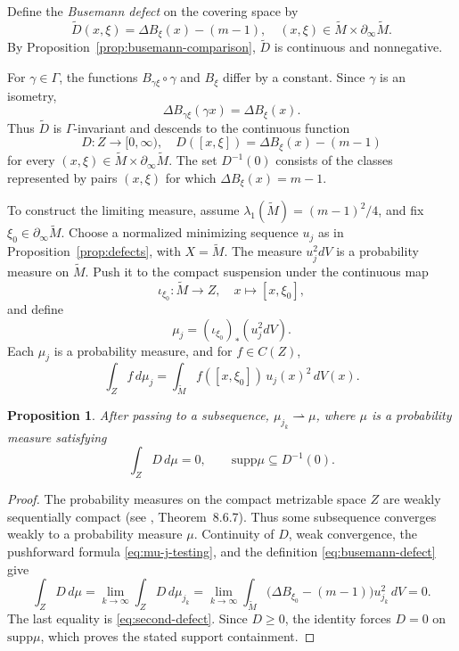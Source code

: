 \documentclass[12pt]{amsart}
\newtheorem{proposition}[theorem]{Proposition}
\theoremstyle{definition}
\numberwithin{equation}{section}
\newcommand{\wti}{\widetilde}
\newcommand{\supp}{\mathrm{supp}}
\begin{document}
Define the \emph{Busemann defect} on the covering space by
\[
  \widetilde D(x,\xi)=\Delta B_\xi(x)-(m-1),
  \quad (x,\xi)\in\wti M\times\partial_\infty\wti M.
\]
By Proposition~\ref{prop:busemann-comparison}, \(\widetilde D\) is
continuous and nonnegative.

For \(\gamma\in\Gamma\), the functions
\(B_{\gamma\xi}\circ\gamma\) and \(B_\xi\) differ by a constant.  Since
\(\gamma\) is an isometry,
\[
  \Delta B_{\gamma\xi}(\gamma x)=\Delta B_\xi(x).
\]
Thus \(\widetilde D\) is \(\Gamma\)-invariant and descends to the
continuous function
\begin{equation}\label{eq:busemann-defect}
  D\colon Z\longrightarrow[0,\infty),
  \quad
  D([x,\xi])=\Delta B_\xi(x)-(m-1)
\end{equation}
for every \((x,\xi)\in\wti M\times\partial_\infty\wti M\).  The set
\(D^{-1}(0)\) consists of the classes represented by pairs
\((x,\xi)\) for which \(\Delta B_\xi(x)=m-1\).

To construct the limiting measure, assume
\(\lambda_1(\wti M)=(m-1)^2/4\), and fix
\(\xi_0\in\partial_\infty\wti M\).  Choose a normalized minimizing sequence
\(u_j\) as in Proposition~\ref{prop:defects}, with \(X=\wti M\).  The
measure \(u_j^2dV\) is a probability measure on \(\wti M\).  Push it to
the compact suspension under the continuous map
\[
  \iota_{\xi_0}\colon\wti M\longrightarrow Z,
  \quad x\longmapsto[x,\xi_0],
\]
and define
\begin{equation}\label{eq:mu-j}
  \mu_j=(\iota_{\xi_0})_*(u_j^2dV).
\end{equation}
Each \(\mu_j\) is a probability measure, and for \(f\in C(Z)\),
\begin{equation}\label{eq:mu-j-testing}
  \int_Z f\,d\mu_j
  =\int_{\wti M}f([x,\xi_0])\,u_j(x)^2\,dV(x).
\end{equation}

\begin{proposition}
\label{prop:defect-support}
After passing to a subsequence, \(\mu_{j_k}\rightharpoonup\mu\), where
\(\mu\) is a probability measure satisfying
\[
  \int_ZD\,d\mu=0,
  \qquad
  \supp\mu\subseteq D^{-1}(0).
\]
\end{proposition}

\begin{proof}
The probability measures on the compact metrizable space \(Z\) are
weakly sequentially compact (see \cite{Bogachev2007},
Theorem~8.6.7).  Thus some subsequence converges weakly to a probability
measure \(\mu\).  Continuity of \(D\), weak convergence, the pushforward
formula \eqref{eq:mu-j-testing}, and the definition
\eqref{eq:busemann-defect} give
\[
  \int_ZD\,d\mu
  =\lim_{k\to\infty}\int_ZD\,d\mu_{j_k}
  =\lim_{k\to\infty}
    \int_{\wti M}\bigl(\Delta B_{\xi_0}-(m-1)\bigr)u_{j_k}^2\,dV
  =0.
\]
The last equality is \eqref{eq:second-defect}.  Since \(D\geq0\),
the identity forces \(D=0\) on \(\supp\mu\), which proves the stated
support containment.
\end{proof}
\end{document}
